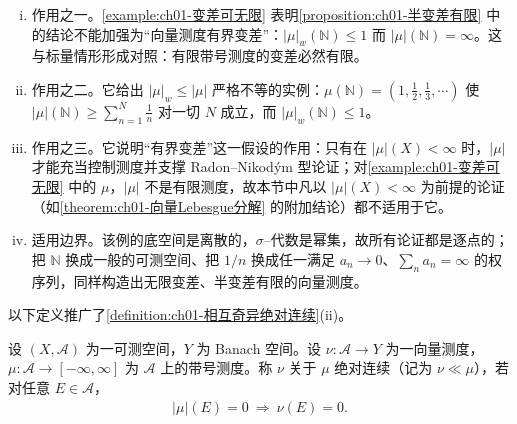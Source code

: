 \documentclass[../../main.tex]{subfiles}%
\begin{document}
\begin{remark}\label{remark:ch01-变差可无限注}
\begin{enumerate}[(i)]
\item 作用之一。\cref{example:ch01-变差可无限} 表明\cref{proposition:ch01-半变差有限} 中的结论不能加强为“向量测度有界变差”：$|\mu|_w(\mathbb{N})\leqslant1$ 而 $|\mu|(\mathbb{N})=\infty$。这与标量情形形成对照：有限带号测度的变差必然有限。
\item 作用之二。它给出 $|\mu|_w\leqslant|\mu|$ 严格不等的实例：$\mu(\mathbb{N})=(1,\frac12,\frac13,\cdots)$ 使 $|\mu|(\mathbb{N})\geqslant\sum_{n=1}^N\frac1n$ 对一切 $N$ 成立，而 $|\mu|_w(\mathbb{N})\leqslant1$。
\item 作用之三。它说明“有界变差”这一假设的作用：只有在 $|\mu|(X)<\infty$ 时，$|\mu|$ 才能充当控制测度并支撑 Radon--Nikodým 型论证；对\cref{example:ch01-变差可无限} 中的 $\mu$，$|\mu|$ 不是有限测度，故本节中凡以 $|\mu|(X)<\infty$ 为前提的论证（如\cref{theorem:ch01-向量Lebesgue分解} 的附加结论）都不适用于它。
\item 适用边界。该例的底空间是离散的，$\sigma$--代数是幂集，故所有论证都是逐点的；把 $\mathbb{N}$ 换成一般的可测空间、把 $1/n$ 换成任一满足 $a_n\to0$、$\sum_na_n=\infty$ 的权序列，同样构造出无限变差、半变差有限的向量测度。
\end{enumerate}
\end{remark}

以下定义推广了\cref{definition:ch01-相互奇异绝对连续}(ii)。

\begin{definition}\label{definition:ch01-向量绝对连续}
设 $(X,\mathcal{A})$ 为一可测空间，$Y$ 为 Banach 空间。设 $\nu:\mathcal{A}\to Y$ 为一向量测度，$\mu:\mathcal{A}\to[-\infty,\infty]$ 为 $\mathcal{A}$ 上的带号测度。称 $\nu$ 关于 $\mu$ 绝对连续（记为 $\nu\ll\mu$），若对任意 $E\in\mathcal{A}$，
\begin{align}
|\mu|(E)=0\ \Longrightarrow\ \nu(E)=0. \label{align:ch01-向量绝对连续}
\end{align}
\end{definition}
\end{document}
